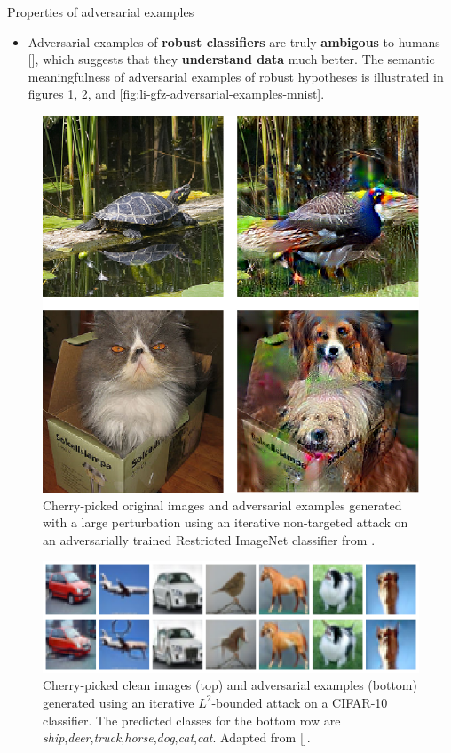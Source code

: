 \documentclass{beamer}
\newcommand{\citet}[1]{{\color{citecolor}\relscale{0.8}\textcite{#1}}}
\newcommand{\citep}[1]{{\color{citecolor}\relscale{0.8}[\textcite{#1}]}}
\begin{document}
\begin{frame}[allowframebreaks=0.9]{Properties of adversarial examples}
\begin{itemize}
    \item Adversarial examples of \textbf{robust classifiers} are truly \textbf{ambigous} to humans \citep{Tsipras:2018:RMBOA,Li:2019:AGCMRAA}, which suggests that they \textbf{understand data} much better. The semantic meaningfulness of adversarial examples of robust hypotheses is illustrated in figures \ref{fig:tsipras-robust-adversarial-examples}, \ref{fig:rony-cifar10-cherry-picked}, and \ref{fig:li-gfz-adversarial-examples-mnist}.
\end{itemize}
\begin{figure}
	\begin{center}
		\includegraphics[width=0.5\columnwidth]{figures/adversarial-examples/tsipras-turtle-bird-cat-dogs}
	\end{center}
	\caption{Cherry-picked original images and adversarial examples generated with a large perturbation using an iterative non-targeted attack on an adversarially trained Restricted ImageNet classifier from \citet{Tsipras:2018:RMBOA}.}
	\label{fig:tsipras-robust-adversarial-examples}
\end{figure}

\begin{figure}
	\begin{center}
		\includegraphics[width=\textwidth]{figures/adversarial-examples/rony/cifar10_cherry_picked}
	\end{center}
	\caption{Cherry-picked clean images (top) and adversarial examples (bottom) generated using an iterative $L^2$-bounded attack on a CIFAR-10 classifier. The predicted classes for the bottom row are \textit{ship},\textit{deer},\textit{truck},\textit{horse},\textit{dog},\textit{cat},\textit{cat}. Adapted from \citep{Rony:2018:DDNEGBLAAD}.}
	\label{fig:rony-cifar10-cherry-picked}
\end{figure}


\end{frame}
\end{document}
